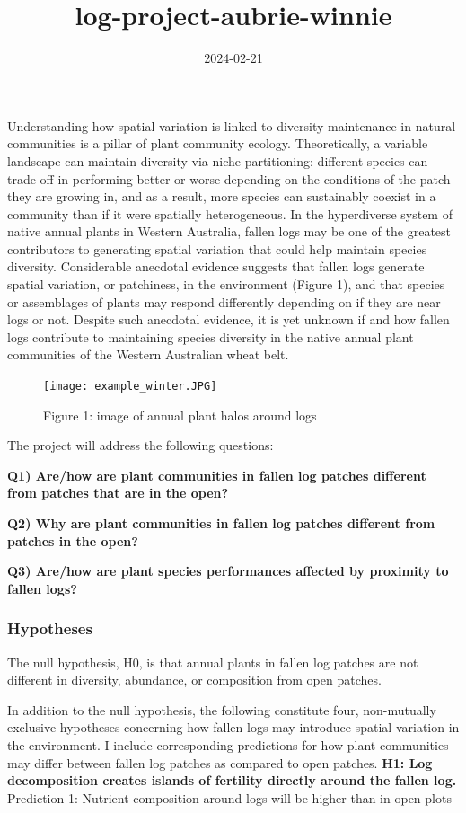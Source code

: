 \documentclass[
]{article}
\title{log-project-aubrie-winnie}
\author{}
\date{\vspace{-2.5em}2024-02-21}
\begin{document}
\maketitle

Understanding how spatial variation is linked to diversity maintenance
in natural communities is a pillar of plant community ecology.
Theoretically, a variable landscape can maintain diversity via niche
partitioning: different species can trade off in performing better or
worse depending on the conditions of the patch they are growing in, and
as a result, more species can sustainably coexist in a community than if
it were spatially heterogeneous. In the hyperdiverse system of native
annual plants in Western Australia, fallen logs may be one of the
greatest contributors to generating spatial variation that could help
maintain species diversity. Considerable anecdotal evidence suggests
that fallen logs generate spatial variation, or patchiness, in the
environment (Figure 1), and that species or assemblages of plants may
respond differently depending on if they are near logs or not. Despite
such anecdotal evidence, it is yet unknown if and how fallen logs
contribute to maintaining species diversity in the native annual plant
communities of the Western Australian wheat belt.

\begin{figure}
\centering
\texttt{[image: example\_winter.JPG]}
\caption{Figure 1: image of annual plant halos around logs}
\end{figure}

The project will address the following questions:

\textbf{Q1) Are/how are plant communities in fallen log patches
different from patches that are in the open?}

\textbf{Q2) Why are plant communities in fallen log patches different
from patches in the open?}

\textbf{Q3) Are/how are plant species performances affected by proximity
to fallen logs?}

\hypertarget{hypotheses}{%
\subsubsection{Hypotheses}\label{hypotheses}}

The null hypothesis, H0, is that annual plants in fallen log patches are
not different in diversity, abundance, or composition from open patches.

In addition to the null hypothesis, the following constitute four,
non-mutually exclusive hypotheses concerning how fallen logs may
introduce spatial variation in the environment. I include corresponding
predictions for how plant communities may differ between fallen log
patches as compared to open patches. \textbf{H1: Log decomposition
creates islands of fertility directly around the fallen log.} Prediction
1: Nutrient composition around logs will be higher than in open plots
\end{document}
